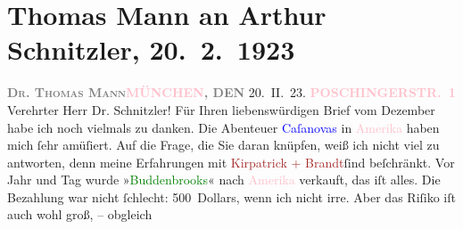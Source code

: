

               \section[Thomas Mann an Arthur Schnitzler, 20. 2. 1923]{ Thomas Mann an Arthur Schnitzler, 20. 2. 1923}\nopagebreak{}\rehead{ }\normalsize\beginnumbering{} \toendnotes[C]{\smallbreak\pagebreak[2]} 
\toendnotes[C]{\smallbreak}\pstart
           \noindent{}{\pb}\textcolor{gray}{\textbf{\textsc{Dr. Thomas Mann}}}\hfill \textcolor{gray}{\textbf{\textcolor{pink}{MÜNCHEN}{}\ledrightnote{\textcolor{pink}{München}}, DEN}}{ }20. II. 23.\pend
           \pstart
           \raggedleft{}\textcolor{gray}{\textbf{\textcolor{pink}{POSCHINGERSTR. 1}{}\ledrightnote{\textcolor{pink}{Poschingerstraße}}}}\pend
           \pstart{}Verehrter Herr Dr. Schnitzler!\pend\pstart
           Für Ihren liebenswürdigen Brief vom Dezember habe ich noch vielmals
                    zu danken. Die Abenteuer \textcolor{green}{\textcolor{blue}{Caſanovas}{}}{}\ledrightnote{\textcolor{green}{Casanovas Heimfahrt}} in \textcolor{pink}{Amerika}{}\ledrightnote{\textcolor{pink}{Amerika}} haben mich ſehr amüſiert. Auf
                    die Frage, die Sie daran knüpfen, weiß ich nicht viel zu antworten, denn meine
                    Erfahrungen mit \textcolor{brown}{Kirpatrick + Brandt}{}ſind beſchränkt. Vor Jahr und Tag wurde »\textcolor{green}{Buddenbrooks}{}\ledrightnote{\textcolor{green}{Buddenbrooks}}« nach \textcolor{pink}{Amerika}{}\ledrightnote{\textcolor{pink}{Amerika}} verkauft, das iſt alles. Die Bezahlung war nicht ſchlecht:
                    500 Dollars, wenn ich nicht irre. Aber das Riſiko iſt auch wohl groß, – obgleich
